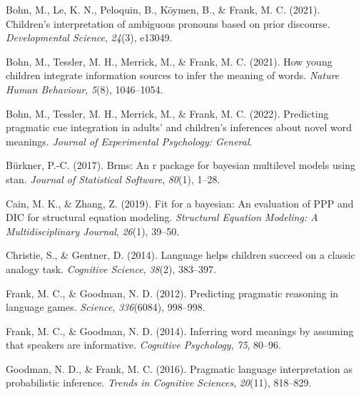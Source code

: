 \documentclass[
  english,
  man,floatsintext]{apa6}
\newlength{\cslhangindent}
\newlength{\cslentryspacingunit} %
\newenvironment{CSLReferences}[2] %
 {%
  \setlength{\parindent}{0pt}
  \ifodd #1
  \let\oldpar\par
  \def\par{\hangindent=\cslhangindent\oldpar}
  \fi
  \setlength{\parskip}{#2\cslentryspacingunit}
 }%
 {}
\begin{document}
\hypertarget{refs}{}
\begin{CSLReferences}{1}{0}
\leavevmode{}%
Bohn, M., Le, K. N., Peloquin, B., Köymen, B., \& Frank, M. C. (2021). Children's interpretation of ambiguous pronouns based on prior discourse. \emph{Developmental Science}, \emph{24}(3), e13049.

\leavevmode{}%
Bohn, M., Tessler, M. H., Merrick, M., \& Frank, M. C. (2021). How young children integrate information sources to infer the meaning of words. \emph{Nature Human Behaviour}, \emph{5}(8), 1046--1054.

\leavevmode{}%
Bohn, M., Tessler, M. H., Merrick, M., \& Frank, M. C. (2022). Predicting pragmatic cue integration in adults' and children's inferences about novel word meanings. \emph{Journal of Experimental Psychology: General}.

\leavevmode{}%
Bürkner, P.-C. (2017). Brms: An r package for bayesian multilevel models using stan. \emph{Journal of Statistical Software}, \emph{80}(1), 1--28.

\leavevmode{}%
Cain, M. K., \& Zhang, Z. (2019). Fit for a bayesian: An evaluation of PPP and DIC for structural equation modeling. \emph{Structural Equation Modeling: A Multidisciplinary Journal}, \emph{26}(1), 39--50.

\leavevmode{}%
Christie, S., \& Gentner, D. (2014). Language helps children succeed on a classic analogy task. \emph{Cognitive Science}, \emph{38}(2), 383--397.

\leavevmode{}%
Frank, M. C., \& Goodman, N. D. (2012). Predicting pragmatic reasoning in language games. \emph{Science}, \emph{336}(6084), 998--998.

\leavevmode{}%
Frank, M. C., \& Goodman, N. D. (2014). Inferring word meanings by assuming that speakers are informative. \emph{Cognitive Psychology}, \emph{75}, 80--96.

\leavevmode{}%
Goodman, N. D., \& Frank, M. C. (2016). Pragmatic language interpretation as probabilistic inference. \emph{Trends in Cognitive Sciences}, \emph{20}(11), 818--829.


\end{CSLReferences}
\end{document}
